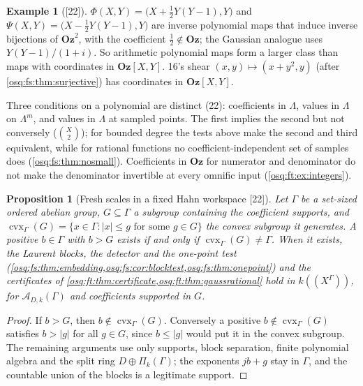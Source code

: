 \documentclass[11pt,letterpaper]{article}
\numberwithin{equation}{section}
\newtheorem{proposition}[proposition]{Proposition}
\theoremstyle{definition}
\newtheorem{example}[example]{Example}
\theoremstyle{remark}
\theoremstyle{plain}
\newcommand{\Oz}{\mathbf{Oz}}
\newcommand{\A}{\mathcal A}          %
\newcommand{\hahn}[2]{#1(\!(X^{#2})\!)}
\newcommand{\src}[1]{\textup{\textsf{[#1]}}}
\begin{document}
\begin{example}[\src{22}]\label{osq:ft:ex:shear}
$\Phi(X,Y)=\bigl(X+\tfrac12Y(Y-1),Y\bigr)$ and $\Psi(X,Y)=\bigl(X-\tfrac12Y(Y-1),Y\bigr)$ are inverse polynomial maps that induce inverse bijections of
$\Oz^2$, with the coefficient $\frac12\notin\Oz$; the Gaussian analogue uses $Y(Y-1)/(1+i)$. So arithmetic polynomial maps form a larger class than maps
with coordinates in $\Oz[X,Y]$. 16's shear $(x,y)\mapsto(x+y^2,y)$ (after \cref{osq:fs:thm:surjective}) has coordinates in $\Oz[X,Y]$.
\end{example}

Three conditions on a polynomial are distinct (22): coefficients in $\Lambda$, values in $\Lambda$ on $\Lambda^m$, and values in $\Lambda$ at sampled
points. The first implies the second but not conversely ($\binom X2$); for bounded degree the tests above make the second and third equivalent, while
for rational functions no coefficient-independent set of samples does (\cref{osq:fs:thm:nosmall}). Coefficients in $\Oz$ for numerator and
denominator do not make the denominator invertible at every omnific input (\cref{osq:ft:ex:integers}).

\begin{proposition}[Fresh scales in a fixed Hahn workspace \src{22}]\label{osq:ft:prop:relative}
Let $\Gamma$ be a set-sized ordered abelian group, $G\subseteq\Gamma$ a subgroup containing the coefficient supports, and
$\operatorname{cvx}_\Gamma(G)=\{x\in\Gamma:|x|\le g\text{ for some }g\in G\}$ the convex subgroup it generates. A positive $b\in\Gamma$ with $b>G$
exists if and only if $\operatorname{cvx}_\Gamma(G)\ne\Gamma$. When it exists, the Laurent blocks, the detector and the one-point test
(\cref{osq:fs:thm:embedding,osq:fs:cor:blocktest,osq:fs:thm:onepoint}) and the certificates of
\cref{osq:ft:thm:certificate,osq:ft:thm:gaussrational} hold in $\hahn k\Gamma$, for $\A_{D,k}(\Gamma)$ and coefficients supported in $G$.
\end{proposition}
\begin{proof}
If $b>G$, then $b\notin\operatorname{cvx}_\Gamma(G)$. Conversely a positive $b\notin\operatorname{cvx}_\Gamma(G)$ satisfies $b>|g|$ for all $g\in G$,
since $b\le|g|$ would put it in the convex subgroup. The remaining arguments use only supports, block separation, finite polynomial algebra and the
split ring $D\oplus\Pi_k(\Gamma)$; the exponents $jb+g$ stay in $\Gamma$, and the countable union of the blocks is a legitimate support.
\end{proof}
\end{document}
